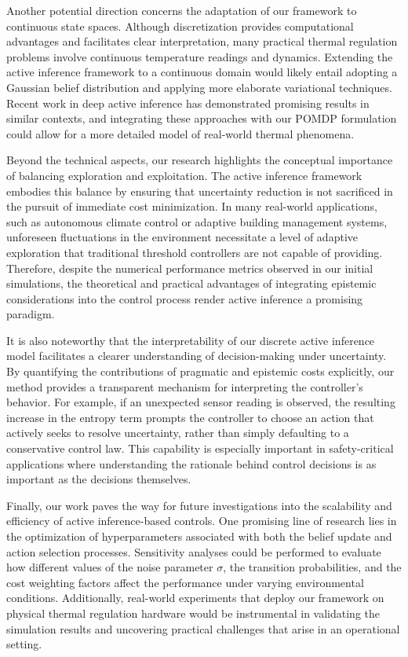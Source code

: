 \documentclass[11pt]{article}
\begin{document}
Another potential direction concerns the adaptation of our framework to continuous state spaces. Although discretization provides computational advantages and facilitates clear interpretation, many practical thermal regulation problems involve continuous temperature readings and dynamics. Extending the active inference framework to a continuous domain would likely entail adopting a Gaussian belief distribution and applying more elaborate variational techniques. Recent work in deep active inference has demonstrated promising results in similar contexts, and integrating these approaches with our POMDP formulation could allow for a more detailed model of real-world thermal phenomena.

Beyond the technical aspects, our research highlights the conceptual importance of balancing exploration and exploitation. The active inference framework embodies this balance by ensuring that uncertainty reduction is not sacrificed in the pursuit of immediate cost minimization. In many real-world applications, such as autonomous climate control or adaptive building management systems, unforeseen fluctuations in the environment necessitate a level of adaptive exploration that traditional threshold controllers are not capable of providing. Therefore, despite the numerical performance metrics observed in our initial simulations, the theoretical and practical advantages of integrating epistemic considerations into the control process render active inference a promising paradigm.

It is also noteworthy that the interpretability of our discrete active inference model facilitates a clearer understanding of decision-making under uncertainty. By quantifying the contributions of pragmatic and epistemic costs explicitly, our method provides a transparent mechanism for interpreting the controller’s behavior. For example, if an unexpected sensor reading is observed, the resulting increase in the entropy term prompts the controller to choose an action that actively seeks to resolve uncertainty, rather than simply defaulting to a conservative control law. This capability is especially important in safety-critical applications where understanding the rationale behind control decisions is as important as the decisions themselves.

Finally, our work paves the way for future investigations into the scalability and efficiency of active inference-based controls. One promising line of research lies in the optimization of hyperparameters associated with both the belief update and action selection processes. Sensitivity analyses could be performed to evaluate how different values of the noise parameter \(\sigma\), the transition probabilities, and the cost weighting factors affect the performance under varying environmental conditions. Additionally, real-world experiments that deploy our framework on physical thermal regulation hardware would be instrumental in validating the simulation results and uncovering practical challenges that arise in an operational setting.
\end{document}
